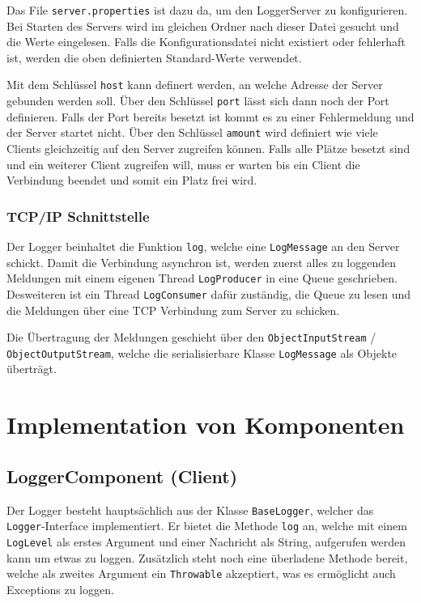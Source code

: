 \documentclass[12pt,a4paper,twosided]{scrartcl}
\begin{document}
Das File \texttt{server.properties} ist dazu da, um den LoggerServer zu konfigurieren. Bei Starten des Servers wird im gleichen Ordner nach dieser Datei gesucht und die Werte eingelesen. Falls die Konfigurationsdatei nicht existiert oder fehlerhaft ist, werden die oben definierten Standard-Werte verwendet.

Mit dem Schlüssel \texttt{host} kann definert werden, an welche Adresse der Server gebunden werden soll. Über den Schlüssel \texttt{port} lässt sich dann noch der Port definieren. Falls der Port bereits besetzt ist kommt es zu einer Fehlermeldung und der Server startet nicht. Über den Schlüssel \texttt{amount} wird definiert wie viele Clients gleichzeitig auf den Server zugreifen können. Falls alle Plätze besetzt sind und ein weiterer Client zugreifen will, muss er warten bis ein Client die Verbindung beendet und somit ein Platz frei wird.

\subsubsection{TCP/IP Schnittstelle}
Der Logger beinhaltet die Funktion \texttt{log}, welche eine \texttt{LogMessage} an den Server schickt. Damit die Verbindung asynchron ist, werden zuerst alles zu loggenden Meldungen mit einem eigenen Thread \texttt{LogProducer} in eine Queue geschrieben. Desweiteren ist ein Thread \texttt{LogConsumer} dafür zuständig, die Queue zu lesen und die Meldungen über eine TCP Verbindung zum Server zu schicken.

Die Übertragung der Meldungen geschieht über den \texttt{ObjectInputStream} / \texttt{ObjectOutputStream}, welche die serialisierbare Klasse \texttt{LogMessage} als Objekte überträgt.

\newpage

\section{Implementation von Komponenten}
\subsection{LoggerComponent (Client)}
Der Logger besteht hauptsächlich aus der Klasse \texttt{BaseLogger}, welcher das \texttt{Logger}-Interface implementiert. Er bietet die Methode \texttt{log} an, welche mit einem \texttt{LogLevel} als erstes Argument und einer Nachricht als String, aufgerufen werden kann um etwas zu loggen. Zusätzlich steht noch eine überladene Methode bereit, welche als zweites Argument ein \texttt{Throwable} akzeptiert, was es ermöglicht auch Exceptions zu loggen.
\end{document}
